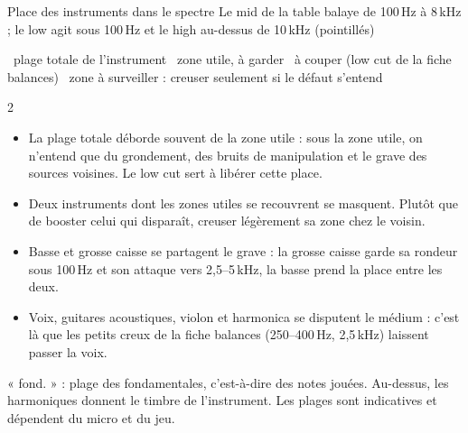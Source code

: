 \documentclass[9pt]{extarticle}
\begin{document}
{\displayfont\fontsize{17}{19}\selectfont Place des instruments dans le spectre}\hfill
{\small\color{doux}Le mid de la table balaye de 100\,Hz à 8\,kHz ; le low agit sous 100\,Hz et le high au-dessus de 10\,kHz (pointillés)}

\vspace{1.2mm}
{\scriptsize\color{doux}
~plage totale de l'instrument \quad
{}~zone utile, à garder \quad
{}~à couper (low cut de la fiche balances) \quad
{}~zone à surveiller : creuser seulement si le défaut s'entend}

\vspace{4mm}

\vspace{4mm}
\setlength{\columnsep}{9mm}
\begin{multicols}{2}
\fontsize{9}{11.5}\selectfont
{}
\begin{itemize}
  \item La plage totale déborde souvent de la zone utile : sous la zone utile, on n'entend que du grondement, des bruits de manipulation et le grave des sources voisines. Le low cut sert à libérer cette place.
  \item Deux instruments dont les zones utiles se recouvrent se masquent. Plutôt que de booster celui qui disparaît, creuser légèrement sa zone chez le voisin.
  \item Basse et grosse caisse se partagent le grave : la grosse caisse garde sa rondeur sous 100\,Hz et son attaque vers 2,5–5\,kHz, la basse prend la place entre les deux.
  \item Voix, guitares acoustiques, violon et harmonica se disputent le médium : c'est là que les petits creux de la fiche balances (250–400\,Hz, 2,5\,kHz) laissent passer la voix.
\end{itemize}
\end{multicols}

\vfill
{\scriptsize\color{doux}« fond. » : plage des fondamentales, c'est-à-dire des notes jouées. Au-dessus, les harmoniques donnent le timbre de l'instrument. Les plages sont indicatives et dépendent du micro et du jeu.}
\end{document}

